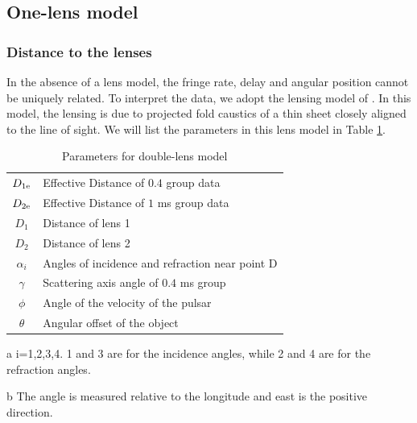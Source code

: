 \documentclass[useAMS,usenatbib]{mn2e}
\begin{document}

\subsection{One-lens model}
\subsubsection{Distance to the lenses}
In the absence of a lens model, the
fringe rate, delay and angular position cannot be uniquely related.  To interpret the data, we adopt the lensing model of
\citet{2014MNRAS.442.3338P}.  In this model, the lensing is due to projected fold caustics of a thin sheet closely aligned to the line of sight.  We will list the parameters in this lens model in Table \ref{tab:parameters}.

\begin{table}
\caption{Parameters for double-lens model}
\begin{threeparttable}
\begin{tabular}{cl}
\hline
$D_{1\rm e}$  & 
Effective Distance of $0.4$ group data\\
$D_{2\rm e}$ 
	&  Effective Distance of $1$ ms group data\\
$D_1$ 		&  Distance of lens 1 \\
$D_2$	& Distance of lens 2 \\
$\alpha_i$ & Angles of incidence and refraction near point D\tnote{a}\\
$\gamma$ &  Scattering axis angle of $0.4$ ms group\tnote{b} \\
$\phi$	& Angle of the velocity of the pulsar\tnote{b}\\
$\theta$ & Angular offset of the object \\
\hline
\end{tabular}

\begin{tablenotes}
\item[a]{i=1,2,3,4.  1 and 3 are for the incidence angles, while 2 and 4 are for the refraction angles.}
\item[b]{The angle is measured relative to the longitude and east is the positive direction.}
\end{tablenotes}
\label{tab:parameters}
\end{threeparttable}
\end{table}
\end{document}
